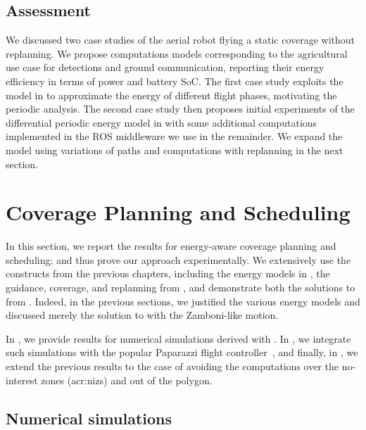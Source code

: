 \subsection{Assessment}

We discussed two case studies of the aerial robot flying a static coverage without replanning. We propose computations models corresponding to the agricultural use case for detections and ground communication, reporting their energy efficiency in terms of power and battery SoC. The first case study exploits the model in  to approximate the energy of different flight phases, motivating the periodic analysis.  The second case study then proposes initial experiments of the differential periodic energy model in  with some additional computations implemented in the ROS middleware we use in the remainder. We expand the model using variations of paths and computations with replanning in the next section.


\section{Coverage Planning and Scheduling}
\label{sec:res-dyn}

In this section, we report the results for energy-aware coverage planning and scheduling; and thus prove our approach experimentally. We extensively use the constructs from the previous chapters, including the energy models in , the guidance, coverage, and replanning from , and demonstrate both the solutions to  from . Indeed, in the previous sections, we justified the various energy models and discussed merely the solution to  with the Zamboni-like motion. 

In , we provide results for numerical simulations derived with \matlab{}. In , we integrate such simulations with the popular Paparazzi flight controller~\citep{papa}, and finally, in , we extend the previous results to the case of avoiding the computations over the no-interest zones (\Gls{acr:niz}s) and out of the polygon.

\subsection{Numerical simulations}
\label{sec:res-num-simu}

